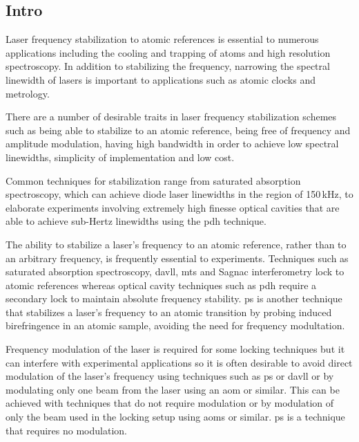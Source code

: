 \documentclass{article}
\begin{document}
\begin{multicols}{2}

\section{Intro}
Laser frequency stabilization to atomic references is essential to numerous applications including the cooling and trapping of atoms\cite{uetake_high_2008, ye_stable_2010, akamatsu_narrow_2012} and high resolution spectroscopy\cite{rafac_sub-dekahertz_2000}. In addition to stabilizing the frequency, narrowing the spectral linewidth of lasers is important to applications such as atomic clocks\cite{ludlow_sr_2008} and metrology\cite{metcalf_laser_1999, ye_quantum_2008, demtroder_laser_2003}.

There are a number of desirable traits in laser frequency stabilization schemes such as being able to stabilize to an atomic reference, being free of frequency and amplitude modulation, having high bandwidth in order to achieve low spectral linewidths, simplicity of implementation and low cost.

Common techniques for stabilization range from saturated absorption spectroscopy, which can achieve diode laser linewidths in the region of 150\,kHz\cite{cuneo_optically_1994}, to elaborate experiments involving extremely high finesse optical cavities that are able to achieve sub-Hertz linewidths using the \gls*{pdh} technique\cite{ludlow_compact_2007}.

The ability to stabilize a laser's frequency to an atomic reference, rather than to an arbitrary frequency, is frequently essential to experiments. Techniques such as saturated absorption spectroscopy\cite{maguire_theoretical_2006, haroche_theory_1972, preston_doppler-free_1996}, \gls*{davll}\cite{corwin_frequency-stabilized_1998,millett-sikking_davll_2007}, \gls*{mts}\cite{shirley_modulation_1982, mccarron_modulation_2008,xiang-hui_ultra-stable_2009} and Sagnac interferometry\cite{robins_Interferometric_2002,jundt_non-linear_2003} lock to atomic references whereas optical cavity techniques such as \gls*{pdh}\cite{drever_laser_1983} require a secondary lock to maintain absolute frequency stability. \Gls*{ps} is another technique that stabilizes a laser's frequency to an atomic transition by probing induced birefringence in an atomic sample, avoiding the need for frequency modultation.

Frequency modulation of the laser is required for some locking techniques but it can interfere with experimental applications so it is often desirable to avoid direct modulation of the laser's frequency using techniques such as \gls*{ps} or \gls*{davll} or by modulating only one beam from the laser using an \gls*{aom} or similar. This can be achieved with techniques that do not require modulation or by modulation of only the beam used in the locking setup using \glspl*{aom} or similar. \Gls*{ps} is a technique that requires no modulation.


\end{multicols}
\end{document}
